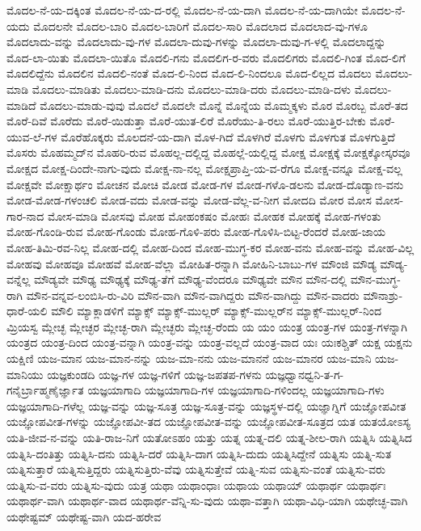 ಮೊದಲ-ನೆ-ಯ-ದಕ್ಕಿಂತ
ಮೊದಲ-ನೆ-ಯ-ದ-ರಲ್ಲಿ
ಮೊದಲ-ನೆ-ಯ-ದಾಗಿ
ಮೊದಲ-ನೆ-ಯ-ದಾಗಿಯೇ
ಮೊದಲ-ನೆ-ಯದು
ಮೊದಲನೇ
ಮೊದಲ-ಬಾರಿ
ಮೊದಲ-ಬಾರಿಗೆ
ಮೊದಲ-ಸಾರಿ
ಮೊದಲಾದ
ಮೊದಲಾದ-ವು-ಗಳೂ
ಮೊದಲಾದು-ವನ್ನು
ಮೊದಲಾದು-ವು-ಗಳ
ಮೊದಲಾ-ದುವು-ಗಳನ್ನು
ಮೊದಲಾ-ದುವು-ಗ-ಳಲ್ಲಿ
ಮೊದಲಾದ್ದನ್ನು
ಮೊದ-ಲಾ-ಯಿತು
ಮೊದಲಾ-ಯಿತೊ
ಮೊದಲಿ-ಗನು
ಮೊದಲಿಗ-ರ-ವರು
ಮೊದಲಿಗರು
ಮೊದಲಿ-ಗಿಂತ
ಮೊದ-ಲಿಗೆ
ಮೊದಲಿದ್ದೆನು
ಮೊದಲಿನ
ಮೊದಲಿ-ನಂತೆ
ಮೊದ-ಲಿ-ನಿಂದ
ಮೊದ-ಲಿ-ನಿಂದಲೂ
ಮೊದ-ಲಿಲ್ಲದ
ಮೊದಲು
ಮೊದಲು-ಮಾಡಿ
ಮೊದಲು-ಮಾಡಿತು
ಮೊದಲು-ಮಾಡಿ-ದನು
ಮೊದಲು-ಮಾಡಿ-ದರು
ಮೊದಲು-ಮಾಡಿ-ದಳು
ಮೊದಲು-ಮಾಡಿದೆ
ಮೊದಲು-ಮಾಡು-ವುವು
ಮೊದಲೆ
ಮೊದಲೇ
ಮೊನ್ನೆ
ಮೊನ್ನೆಯ
ಮೊಮ್ಮಕ್ಕಳು
ಮೊರ
ಮೊರಬ್ಬ
ಮೊರೆ-ತದ
ಮೊರೆ-ದಿವೆ
ಮೊರೆದು
ಮೊರೆ-ಯಿಡುತ್ತಾ
ಮೊರೆ-ಯುತ-ಲಿರೆ
ಮೊರೆಯು-ತಿ-ರಲು
ಮೊರೆ-ಯುತ್ತಿರ-ಬೇಕು
ಮೊರೆ-ಯುವ-ಲೆ-ಗಳ
ಮೊರೆಹೊಕ್ಕರು
ಮೊಲದನೆ-ಯ-ದಾಗಿ
ಮೊಳ-ಗಿದೆ
ಮೊಳಗಿರೆ
ಮೊಳಗು
ಮೊಳಗುತ
ಮೊಳಗುತ್ತಿದೆ
ಮೊಸರು
ಮೊಹಮ್ಮದ್‌ನ
ಮೊಹರಿ-ರುವ
ಮೊಹಲ್ಲ-ದಲ್ಲಿದ್ದ
ಮೊಹಲ್ಲೆ-ಯಲ್ಲಿದ್ದ
ಮೋಕ್ಷ
ಮೋಕ್ಷಕ್ಕೆ
ಮೋಕ್ಷಕ್ಕೋಸ್ಕರವೂ
ಮೋಕ್ಷದ
ಮೋಕ್ಷ-ದಿಂದೇ-ನಾಗು-ವುದು
ಮೋಕ್ಷ-ನಾ-ನಲ್ಲ
ಮೋಕ್ಷಪ್ರಾಪ್ತಿ-ಯ-ವ-ರೆಗೂ
ಮೋಕ್ಷ-ವನ್ನೂ
ಮೋಕ್ಷ-ವಲ್ಲ
ಮೋಕ್ಷವೇ
ಮೋಕ್ಷಾರ್ಥಂ
ಮೋಚನ
ಮೋಚಿ
ಮೋಡ
ಮೋಡ-ಗಳ
ಮೋಡ-ಗಳೊ-ಡಲನು
ಮೋಡ-ದೊಡ್ಯಾಣ-ವನು
ಮೋಡ-ಮೋಡ-ಗಳಂಚಲಿ
ಮೋಡ-ವದು
ಮೋಡ-ವನ್ನು
ಮೋಡ-ವೆಲ್ಲ-ವ-ನೀಗ
ಮೋದದಿ
ಮೋರ
ಮೋಸ
ಮೋಸ-ಗಾರ-ನಾದ
ಮೋಸ-ಮಾಡಿ
ಮೋಸವು
ಮೋಹ
ಮೋಹಂಕಷಂ
ಮೋಹಃ
ಮೋಹಕ
ಮೋಹಕ್ಕೆ
ಮೋಹ-ಗಳಂತು
ಮೋಹ-ಗೊಂಡಿ-ರುವ
ಮೋಹ-ಗೊಂಡು
ಮೋಹ-ಗೊಳಿ-ಪರು
ಮೋಹ-ಗೊಳಿಸಿ-ಬಿಟ್ಟ-ರೆಂದರೆ
ಮೋಹ-ಜಾಯ
ಮೋಹ-ತಿಮಿ-ರವ-ನಿಲ್ಲ
ಮೋಹ-ದಲ್ಲಿ
ಮೋಹ-ದಿಂದ
ಮೋಹ-ಮುಗ್ಧ-ಕರ
ಮೋಹ-ವನು
ಮೋಹ-ವನ್ನು
ಮೋಹ-ವಿಲ್ಲ
ಮೋಹವು
ಮೋಹವೂ
ಮೋಹವೆ
ಮೋಹ-ವೆಲ್ಲಾ
ಮೋಹಿತ-ರನ್ನಾಗಿ
ಮೋಹಿನಿ-ಬಾಬು-ಗಳ
ಮೌಂಜಿ
ಮೌಡ್ಯ
ಮೌಡ್ಯ-ವನ್ನೆಲ್ಲ
ಮೌಡ್ಯವೇ
ಮೌಢ್ಯ
ಮೌಢ್ಯಕ್ಕೆ
ಮೌಢ್ಯ-ತೆಗೆ
ಮೌಢ್ಯ-ವೆಂದರೂ
ಮೌಢ್ಯವೇ
ಮೌನ
ಮೌನ-ದಲ್ಲಿ
ಮೌನ-ಮುಗ್ಧ-ರಾಗಿ
ಮೌನ-ವನ್ನವ-ಲಂಬಿಸಿ-ರು-ವಿರಿ
ಮೌನ-ವಾಗಿ
ಮೌನ-ವಾಗಿದ್ದರು
ಮೌನ-ವಾಗಿದ್ದು
ಮೌನ-ವಾದರು
ಮೌನಾಶ್ರು-ಧಾರೆ-ಯಲಿ
ಮೌಲಿ
ಮ್ಯಾಕ್ಲಾಡಳಿಗೆ
ಮ್ಯಾಕ್ಸ್
ಮ್ಯಾಕ್ಸ್‌-ಮುಲ್ಲರ್
ಮ್ಯಾಕ್ಸ್‌-ಮುಲ್ಲರ್‌ನ
ಮ್ಯಾಕ್ಸ್‌-ಮುಲ್ಲರ್‌-ನಿಂದ
ಮ್ರಿಯಸ್ವ
ಮ್ಲೇಚ್ಛ
ಮ್ಲೇಚ್ಛರ
ಮ್ಲೇಚ್ಛ-ರಾಗಿ
ಮ್ಲೇಚ್ಛರು
ಮ್ಲೇಚ್ಛ-ರೆಂದು
ಯ
ಯಂ
ಯಂತ್ರ
ಯಂತ್ರ-ಗಳ
ಯಂತ್ರ-ಗಳನ್ನಾಗಿ
ಯಂತ್ರದ
ಯಂತ್ರ-ದಿಂದ
ಯಂತ್ರ-ವನ್ನಾಗಿ
ಯಂತ್ರ-ವನ್ನು
ಯಂತ್ರ-ವಲ್ಲದೆ
ಯಂತ್ರ-ವಾದ
ಯಃ
ಯಃಕಶ್ಚಿತ್
ಯಕ್ಷ
ಯಕ್ಷನು
ಯಕ್ಷಿಣಿ
ಯಜ-ಮಾನ
ಯಜ-ಮಾನ-ನನ್ನು
ಯಜ-ಮಾ-ನನು
ಯಜ-ಮಾನನೆ
ಯಜ-ಮಾನರ
ಯಜ-ಮಾನಿ
ಯಜ-ಮಾನಿಯು
ಯಜ್ಞಕುಂಡದಿ
ಯಜ್ಞ-ಗಳ
ಯಜ್ಞ-ಗಳಿಗೆ
ಯಜ್ಞ-ಜಪತಪ-ಗಳನು
ಯಜ್ಞಧ್ವಾನಧ್ವನಿ-ತ-ಗ-ಗನೈರ್ಬ್ರಾಹ್ಮಣೈರ್ಜ್ಞಾತ
ಯಜ್ಞಯಾಗಾದಿ
ಯಜ್ಞಯಾಗಾದಿ-ಗಳ
ಯಜ್ಞಯಾಗಾದಿ-ಗಳಿಂದಲ್ಲ
ಯಜ್ಞಯಾಗಾದಿ-ಗಳು
ಯಜ್ಞಯಾಗಾದಿ-ಗಳೆಲ್ಲ
ಯಜ್ಞ-ವನ್ನು
ಯಜ್ಞ-ಸೂತ್ರ
ಯಜ್ಞ-ಸೂತ್ರ-ವನ್ನು
ಯಜ್ಞಸ್ಥಳ-ದಲ್ಲಿ
ಯಜ್ಞಾಗ್ನಿಗೆ
ಯಜ್ಞೋಪವೀತ
ಯಜ್ಞೋಪವೀತ-ಗಳನ್ನು
ಯಜ್ಞೋಪವೀ-ತದ
ಯಜ್ಞೋಪವೀತ-ವನ್ನು
ಯಜ್ಞೋಪವೀತ-ಸೂತ್ರದ
ಯತ
ಯತಯೋಽಸ್ಯ
ಯತಿ-ಜೀವ-ನ-ವನ್ನು
ಯತಿ-ರಾಜ-ನಿಗೆ
ಯತೋಽಹಂ
ಯತ್ತು
ಯತ್ನ
ಯತ್ನ-ದಲಿ
ಯತ್ನ-ಶೀಲ-ರಾಗಿ
ಯತ್ನಿಸಿ
ಯತ್ನಿಸಿದ
ಯತ್ನಿಸಿ-ದಂತಿತ್ತು
ಯತ್ನಿಸಿ-ದನು
ಯತ್ನಿಸಿ-ದರೆ
ಯತ್ನಿಸಿ-ದಾಗ
ಯತ್ನಿಸಿ-ದುದು
ಯತ್ನಿಸಿದ್ದೇನೆ
ಯತ್ನಿಸು
ಯತ್ನಿ-ಸುತ
ಯತ್ನಿಸುತ್ತಾರೆ
ಯತ್ನಿಸುತ್ತಿದ್ದರು
ಯತ್ನಿಸುತ್ತಿರು-ವೆವು
ಯತ್ನಿಸುತ್ತೇವೆ
ಯತ್ನಿ-ಸುವ
ಯತ್ನಿಸು-ವಂತೆ
ಯತ್ನಿಸು-ವರು
ಯತ್ನಿಸು-ವ-ವರು
ಯತ್ನಿಸು-ವುದು
ಯತ್ರ
ಯಥಾ
ಯಥಾಂಧಾಃ
ಯಥಾಯ
ಯಥಾಯ್
ಯಥಾರ್ಥ
ಯಥಾರ್ಥಃ
ಯಥಾರ್ಥ-ವಾಗಿ
ಯಥಾರ್ಥ-ವಾದ
ಯಥಾರ್ಥ-ವೆನ್ನಿ-ಸು-ವುದು
ಯಥಾ-ವತ್ತಾಗಿ
ಯಥಾ-ವಿಧಿ-ಯಾಗಿ
ಯಥೇಚ್ಛ-ವಾಗಿ
ಯಥೇಷ್ಟಮ್
ಯಥೇಷ್ಟ-ವಾಗಿ
ಯದ-ಹರೇವ
